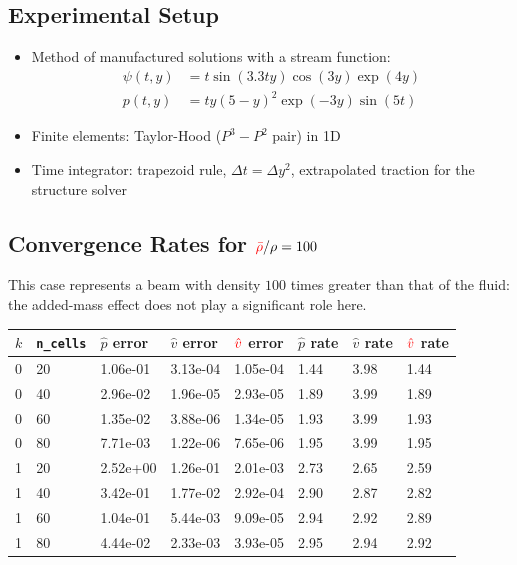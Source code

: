 \documentclass[
paperwidth=48in,paperheight=36in,
fontscale=0.4
]{baposter}
\begin{document}
\begin{poster}
{\subsection{Experimental Setup}
    \begin{itemize}
        \item Method of manufactured solutions with a stream function:
              \begin{align*}
                  \psi(t, y) &= t \sin(3.3 t y) \cos(3 y) \exp(4 y)           \\
                  p(t, y)    &= t y (5 - y)^2 \exp(-3 y) \sin(5 t)
              \end{align*}
        \item Finite elements: Taylor-Hood (\(P^3-P^2\) pair) in 1D
        \item Time integrator: trapezoid rule, \(\Delta t = \Delta y^2\),
              extrapolated traction for the structure solver
    \end{itemize}
\subsection{Convergence Rates for \({\color{red} \bar{\rho}}/\rho = 100\)}
    This case represents a beam with density \(100\) times greater than that
    of the fluid: the added-mass effect does not play a significant role
    here.
    \begin{center}
        \begin{tabular}{| l | l | l | l | l | l | l | l |}
            \hline
            \(k\) & \texttt{n\_cells} &
            \(\hat{p}\) error & \(\hat{v}\) error & \({\color{red} \hat{v}}\) error &
            \(\hat{p}\) rate & \(\hat{v}\) rate & \({\color{red} \hat{v}}\) rate    \\
            \hline
            0 & 20 & 1.06e-01 & 3.13e-04 & 1.05e-04 & 1.44 & 3.98 & 1.44      \\
            0 & 40 & 2.96e-02 & 1.96e-05 & 2.93e-05 & 1.89 & 3.99 & 1.89      \\
            0 & 60 & 1.35e-02 & 3.88e-06 & 1.34e-05 & 1.93 & 3.99 & 1.93      \\
            0 & 80 & 7.71e-03 & 1.22e-06 & 7.65e-06 & 1.95 & 3.99 & 1.95      \\
            \hline
            1 & 20 & 2.52e+00 & 1.26e-01 & 2.01e-03 & 2.73 & 2.65 & 2.59      \\
            1 & 40 & 3.42e-01 & 1.77e-02 & 2.92e-04 & 2.90 & 2.87 & 2.82      \\
            1 & 60 & 1.04e-01 & 5.44e-03 & 9.09e-05 & 2.94 & 2.92 & 2.89      \\
            1 & 80 & 4.44e-02 & 2.33e-03 & 3.93e-05 & 2.95 & 2.94 & 2.92      \\
            \hline
        \end{tabular}
    \end{center}

}
\end{poster}
\end{document}
